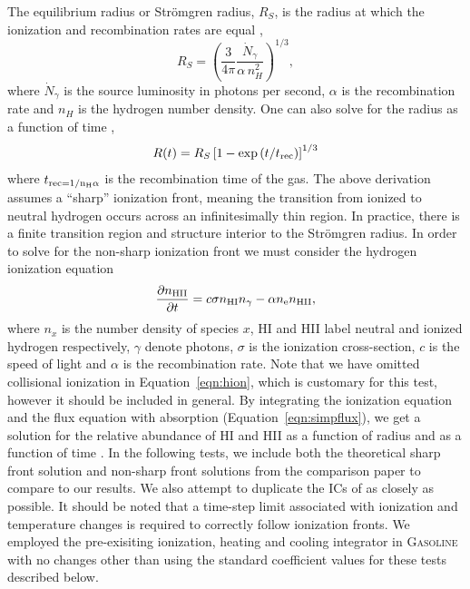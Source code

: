 \documentclass[fleq,usenatbib]{mnras}
\newcommand{\strom}{Str\"omgren}
\begin{document}
{The equilibrium radius or \strom{} radius, $R_S$, is the radius at which the 
ionization and recombination rates are equal \citep[e.g.][]{tielens05},
\begin{equation}
R_S = \left(\frac{3}{4\pi}\frac{\dot{N}_\gamma}{\alpha\, n^2_{H}}\right)^{1/3},
\end{equation}
where $\dot{N}_\gamma$ is the source luminosity in photons per second, 
$\alpha$ is the recombination rate and $n_H$ is the hydrogen number density. 
One can also solve for the radius as a function of time 
\citep[e.g.][]{spitzer78},
\begin{equation}\label{eqn:stromtime}
R(t) = R_S\left[1-\exp\left(t/t_{\rm rec}\right)\right]^{1/3}
\end{equation}
where $t_{\rm rec = 1/{n_H \alpha}}$ is the recombination time of the 
gas. The above derivation assumes a ``sharp'' ionization front, meaning the 
transition from ionized to neutral hydrogen occurs across an infinitesimally 
thin region. In practice, there is a finite transition region and structure
interior to the \strom{} radius. 
In order to solve for the non-sharp ionization front we must consider the 
hydrogen ionization equation
\begin{equation}\label{eqn:hion}
\frac{\partial n_{\rm HII}}{\partial t} = c \sigma n_{\rm HI} n_{\gamma} - 
\alpha n_{\rm e} n_{\rm HII},
\end{equation}
where $n_x$ is the number density of species $x$, HI and HII label neutral 
and ionized hydrogen respectively, $\gamma$ denote photons, $\sigma$ is the 
ionization cross-section, $c$ is the speed of light and $\alpha$ is the 
recombination rate. Note that we have omitted collisional ionization in 
Equation~\ref{eqn:hion}, which is customary for this test, however it 
should be included in general. By integrating the ionization equation and the 
flux equation with absorption (Equation~\ref{eqn:simpflux}), we get a solution 
for the relative abundance of HI and HII as a function of radius and as a 
function of time \citep{osterbrockFerland2006}. In the following tests, we 
include both the theoretical sharp front solution and non-sharp front 
solutions from the \cite{ilievEt06} comparison paper to compare to our 
results. We also attempt to duplicate the ICs of 
\cite{ilievEt06} as closely as possible.  It should be noted that a time-step
limit associated with ionization and temperature changes is required to correctly
follow ionization fronts.  We employed the pre-exisiting ionization, heating
and cooling integrator in \textsc{Gasoline} with no changes other than
using the standard coefficient values for these tests described below.

}
\end{document}
